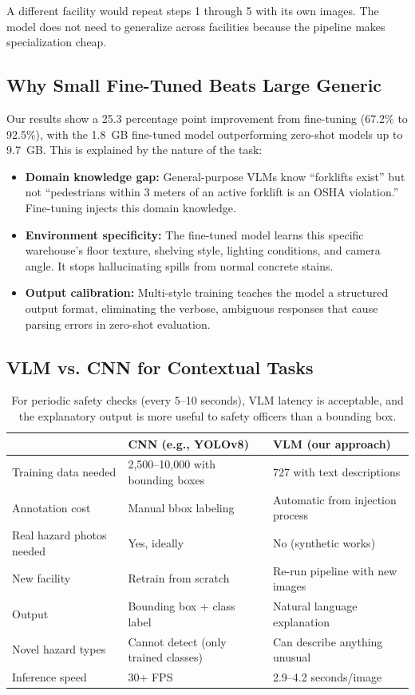 \documentclass[12pt, a4paper]{article}
\begin{document}
A different facility would repeat steps 1 through 5 with its own images. The model does not need to generalize across facilities because the pipeline makes specialization cheap.

\subsection{Why Small Fine-Tuned Beats Large Generic}

Our results show a 25.3 percentage point improvement from fine-tuning (67.2\% to 92.5\%), with the 1.8~GB fine-tuned model outperforming zero-shot models up to 9.7~GB. This is explained by the nature of the task:

\begin{itemize}
    \item \textbf{Domain knowledge gap:} General-purpose VLMs know ``forklifts exist'' but not ``pedestrians within 3 meters of an active forklift is an OSHA violation.'' Fine-tuning injects this domain knowledge.
    \item \textbf{Environment specificity:} The fine-tuned model learns this specific warehouse's floor texture, shelving style, lighting conditions, and camera angle. It stops hallucinating spills from normal concrete stains.
    \item \textbf{Output calibration:} Multi-style training teaches the model a structured output format, eliminating the verbose, ambiguous responses that cause parsing errors in zero-shot evaluation.
\end{itemize}

\subsection{VLM vs. CNN for Contextual Tasks}

\begin{table}[H]
\centering
\begin{tabular}{lll}
\toprule
& \textbf{CNN (e.g., YOLOv8)} & \textbf{VLM (our approach)} \\
\midrule
Training data needed & 2,500--10,000 with bounding boxes & 727 with text descriptions \\
Annotation cost & Manual bbox labeling & Automatic from injection process \\
Real hazard photos needed & Yes, ideally & No (synthetic works) \\
New facility & Retrain from scratch & Re-run pipeline with new images \\
Output & Bounding box + class label & Natural language explanation \\
Novel hazard types & Cannot detect (only trained classes) & Can describe anything unusual \\
Inference speed & 30+ FPS & 2.9--4.2 seconds/image \\
\bottomrule
\end{tabular}
\caption{For periodic safety checks (every 5--10 seconds), VLM latency is acceptable, and the explanatory output is more useful to safety officers than a bounding box.}
\end{table}
\end{document}
